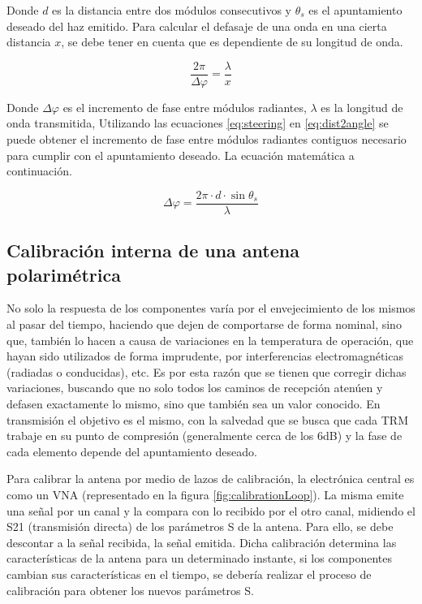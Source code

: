Donde $d$ es la distancia entre dos módulos consecutivos y $\theta_s$ es el apuntamiento deseado del haz emitido. Para calcular
el defasaje de una onda en una cierta distancia $x$, se debe tener en cuenta que es dependiente de su longitud de onda.

\begin{equation}
	\dfrac{2\pi}{\Delta\varphi} = \dfrac{\lambda}{x}
	\label{eq:dist2angle}
\end{equation}

Donde $\Delta\varphi$ es el incremento de fase entre módulos radiantes, $\lambda$ es la longitud de onda transmitida,
Utilizando las ecuaciones \ref{eq:steering} en \ref{eq:dist2angle} se puede obtener el incremento de fase entre módulos radiantes
contiguos necesario para cumplir con el apuntamiento deseado. La ecuación matemática a continuación.

\begin{equation}
	\Delta\varphi = \dfrac{2\pi\cdot d\cdot\sin{\theta_s}}{\lambda}
\end{equation}

\subsection{Calibración interna de una antena polarimétrica}

No solo la respuesta de los componentes varía por el envejecimiento de los mismos al pasar del tiempo, haciendo que dejen de
comportarse de forma nominal, sino que, también lo hacen a causa de variaciones en la temperatura de operación, que hayan sido
utilizados de forma imprudente, por interferencias electromagnéticas (radiadas o conducidas), etc. Es por esta razón que se
tienen que corregir dichas variaciones, buscando que no solo todos los caminos de recepción atenúen y defasen exactamente lo
mismo, sino que también sea un valor conocido. En transmisión el objetivo es el mismo, con la salvedad que se busca que cada
TRM trabaje en su punto de compresión (generalmente cerca de los 6dB) y la fase de cada elemento depende del apuntamiento
deseado.

Para calibrar la antena por medio de lazos de calibración, la electrónica central es como un VNA (representado en la figura
\ref{fig:calibrationLoop}). La misma emite una señal por un canal y la compara con lo recibido por el otro canal, midiendo el
S21 (transmisión directa) de los parámetros S de la antena. Para ello, se debe descontar a la señal recibida, la señal emitida.
Dicha calibración determina las características de la antena para un determinado instante, si los componentes cambian sus
características en el tiempo, se debería realizar el proceso de calibración para obtener los nuevos parámetros S.

